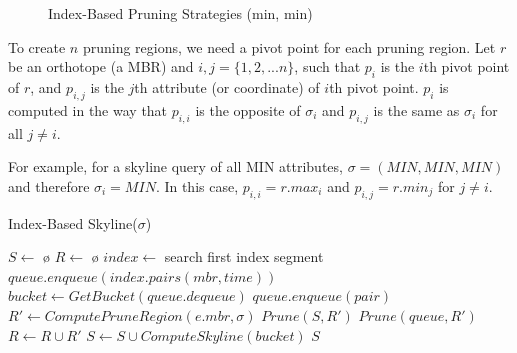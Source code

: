 \begin{figure}
  \centering
  \caption{Index-Based Pruning Strategies (min, min)}
  \label{fig:ibp}
\end{figure}

To create $n$ pruning regions, we need a pivot point for each pruning
region. Let $r$ be an orthotope (a MBR) and $i, j = \{1, 2, ... n\}$, such
that $p_i$ is the $i$th pivot point of $r$, and $p_{i,j}$ is the $j$th
attribute (or coordinate) of $i$th pivot point. $p_i$ is computed in the
way that $p_{i,i}$ is the opposite of $\sigma_i$ and $p_{i,j}$ is the same
as $\sigma_i$ for all $j \neq i$.

For example, for a skyline query of all MIN attributes,
$\sigma = (MIN, MIN, MIN)$ and therefore $\sigma_i = MIN$. In this case,
$p_{i,i} = r.max_i$ and $p_{i,j} = r.min_j$ for $j \neq i$.

\begin{algorithm}
\caption{Index-Based Skyline($\sigma$)} \label{alg:IBSkyline}
\begin{algorithmic}[1]

\STATE $S \gets$ \o
\STATE $R \gets$ \o
\STATE $index \gets$ search first index segment
\STATE $queue.enqueue(index.pairs(mbr, time))$
    \STATE $bucket \gets GetBucket(queue.dequeue)$
                \STATE $queue.enqueue(pair)$
                \STATE $R' \gets ComputePruneRegion(e.mbr, \sigma)$
                \STATE $Prune(S, R')$
                \STATE $Prune(queue, R')$
                \STATE $R \gets R \cup R'$
            \ENDIF
        \ENDFOR
    \ELSE
        \STATE $S \gets S \cup ComputeSkyline(bucket)$
    \ENDIF
\ENDWHILE \RETURN $S$
\end{algorithmic}
\end{algorithm}

